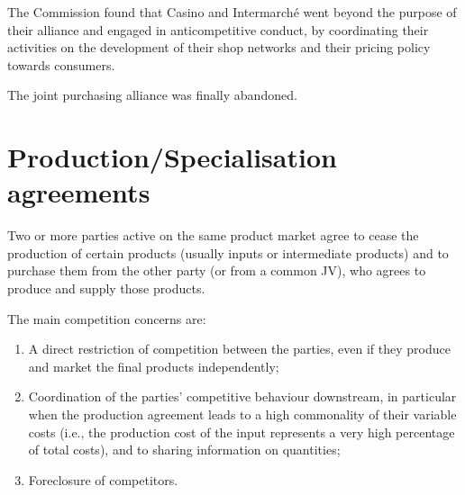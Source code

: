         The Commission found that Casino and Intermarché went beyond the purpose of their alliance and engaged in anticompetitive conduct, by coordinating their activities on the development of their shop networks and their pricing policy towards consumers.
        
        The joint purchasing alliance was finally abandoned.
        

\section{Production/Specialisation agreements}

    Two or more parties active on the same product market agree to cease the production of certain products (usually inputs or intermediate products) and to purchase them from the other party (or from a common JV), who agrees to produce and supply those products.
    
    The main competition concerns are:
    \begin{enumerate}[label=\alph*)]
        \item A direct restriction of competition between the parties, even if they produce and market the final products independently;
        \item Coordination of the parties’ competitive behaviour downstream, in particular when the production agreement leads to a high commonality of their variable costs (i.e., the production cost of the input represents a very high percentage of total costs), and to sharing information on quantities;
        \item Foreclosure of competitors.
    \end{enumerate}

